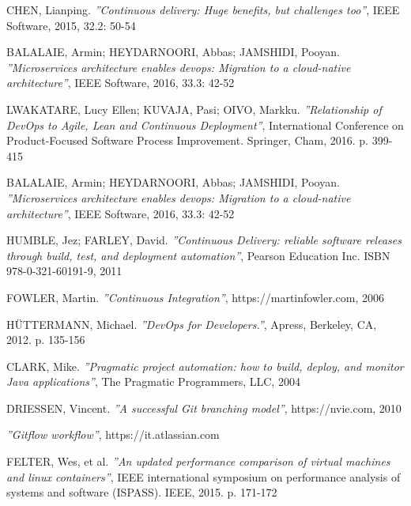 \documentclass[a4paper, 12pt]{report}
\numberwithin{equation}{section}
\begin{document}
\begin{thebibliography}{9}
        CHEN, Lianping.
            \emph{''Continuous delivery: Huge benefits, but challenges too''},
            IEEE Software, 2015, 32.2: 50-54
            
        BALALAIE, Armin; HEYDARNOORI, Abbas; JAMSHIDI, Pooyan.
            \emph{''Microservices architecture enables devops: Migration to a cloud-native architecture''},
            IEEE Software, 2016, 33.3: 42-52
            
        LWAKATARE, Lucy Ellen; KUVAJA, Pasi; OIVO, Markku.
            \emph{''Relationship of DevOps to Agile, Lean and Continuous Deployment''},
            International Conference on Product-Focused Software Process Improvement. Springer, Cham, 2016. p. 399-415
            
        BALALAIE, Armin; HEYDARNOORI, Abbas; JAMSHIDI, Pooyan.
            \emph{''Microservices architecture enables devops: Migration to a cloud-native architecture''},
            IEEE Software, 2016, 33.3: 42-52
        
        HUMBLE, Jez; FARLEY, David.
            \emph{''Continuous Delivery: reliable software releases through build, test, and deployment automation''},
            Pearson Education Inc. ISBN 978-0-321-60191-9, 2011
            
        FOWLER, Martin.
            \emph{''Continuous Integration''},
            https://martinfowler.com, 2006
        
        HÜTTERMANN, Michael. 
            \emph{''DevOps for Developers.''},
            Apress, Berkeley, CA, 2012. p. 135-156
            
        CLARK, Mike.
            \emph{''Pragmatic project automation: how to build, deploy, and monitor Java applications''},
            The Pragmatic Programmers, LLC, 2004
            
        DRIESSEN, Vincent.
            \emph{''A successful Git branching model''},
            https://nvie.com, 2010
            
            \emph{''Gitflow workflow''},
            https://it.atlassian.com  
            
        FELTER, Wes, et al.
            \emph{''An updated performance comparison of virtual machines and linux containers''},
            IEEE international symposium on performance analysis of systems and software (ISPASS). IEEE, 2015. p. 171-172
            

\end{thebibliography}
\end{document}
